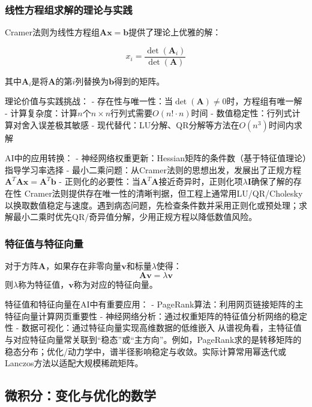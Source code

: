 \subsubsection{线性方程组求解的理论与实践}

Cramer法则为线性方程组$\mathbf{A}\mathbf{x} = \mathbf{b}$提供了理论上优雅的解：

$$x_i = \frac{\det(\mathbf{A}_i)}{\det(\mathbf{A})}$$

其中$\mathbf{A}_i$是将$\mathbf{A}$的第$i$列替换为$\mathbf{b}$得到的矩阵。

理论价值与实践挑战：
- 存在性与唯一性：当$\det(\mathbf{A}) \neq 0$时，方程组有唯一解
- 计算复杂度：计算$n$个$n \times n$行列式需要$O(n! \cdot n)$时间
- 数值稳定性：行列式计算对舍入误差极其敏感
- 现代替代：LU分解、QR分解等方法在$O(n^3)$时间内求解

AI中的应用转换：
- 神经网络权重更新：Hessian矩阵的条件数（基于特征值理论）指导学习率选择
- 最小二乘问题：从Cramer法则的思想出发，发展出了正规方程$\mathbf{A}^T\mathbf{A}\mathbf{x} = \mathbf{A}^T\mathbf{b}$
- 正则化的必要性：当$\mathbf{A}^T\mathbf{A}$接近奇异时，正则化项$\lambda\mathbf{I}$确保了解的存在性
Cramer法则提供存在唯一性的清晰判据，但工程上通常用LU/QR/Cholesky以换取数值稳定与速度。遇到病态问题，先检查条件数并采用正则化或预处理；求解最小二乘时优先QR/奇异值分解，少用正规方程以降低数值风险。

\subsubsection{特征值与特征向量}
对于方阵$\mathbf{A}$，如果存在非零向量$\mathbf{v}$和标量$\lambda$使得：
$$\mathbf{A}\mathbf{v} = \lambda\mathbf{v}$$
则$\lambda$称为特征值，$\mathbf{v}$称为对应的特征向量。

特征值和特征向量在AI中有重要应用：
- PageRank算法：利用网页链接矩阵的主特征向量计算网页重要性
- 神经网络分析：通过权重矩阵的特征值分析网络的稳定性
- 数据可视化：通过特征向量实现高维数据的低维嵌入
从谱视角看，主特征值与对应特征向量常关联到“稳态”或“主方向”。例如，PageRank求的是转移矩阵的稳态分布；优化/动力学中，谱半径影响稳定与收敛。实际计算常用幂迭代或Lanczos方法以适配大规模稀疏矩阵。

\subsection{微积分：变化与优化的数学}

